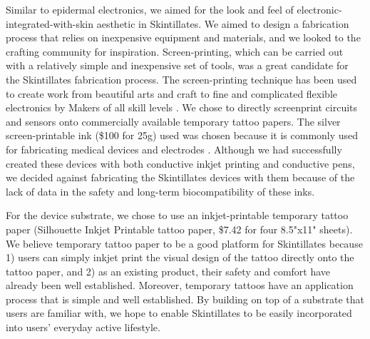 \documentclass{sigchi}
\begin{document}
Similar to epidermal electronics, we aimed for the look and feel of electronic-integrated-with-skin aesthetic in Skintillates. We aimed to design a fabrication process that relies on inexpensive equipment and materials, and we looked to the crafting community for inspiration. Screen-printing, which can be carried out with a relatively simple and inexpensive set of tools, was a great candidate for the Skintillates fabrication process. The screen-printing technique has been used to create work from beautiful arts and craft to fine and complicated flexible electronics by Makers of all skill levels \cite{Olberding:2014ds,Perry:CXGigkdt,Dillon:2008uc}. We chose to directly screenprint circuits and sensors onto commercially available temporary tattoo papers. The silver screen-printable ink (\$100 for 25g) used was chosen because it is commonly used for fabricating medical devices and electrodes \cite{Cristea:2009uq,Rattfalt:2013ts}. Although we had successfully created these devices with both conductive inkjet printing and conductive pens, we decided against fabricating the Skintillates devices with them because of the lack of data in the safety and long-term biocompatibility of these inks. 

For the device substrate, we chose to use an inkjet-printable temporary tattoo paper (Silhouette Inkjet Printable tattoo paper, \$7.42 for four 8.5"x11" sheets). We believe temporary tattoo paper to be a good platform for Skintillates because 1) users can simply inkjet print the visual design of the tattoo directly onto the tattoo paper, and 2) as an existing product, their safety and comfort have already been well established. Moreover, temporary tattoos have an application process that is simple and well established. By building on top of a substrate that users are familiar with, we hope to enable Skintillates to be easily incorporated into users' everyday active lifestyle.
\end{document}
